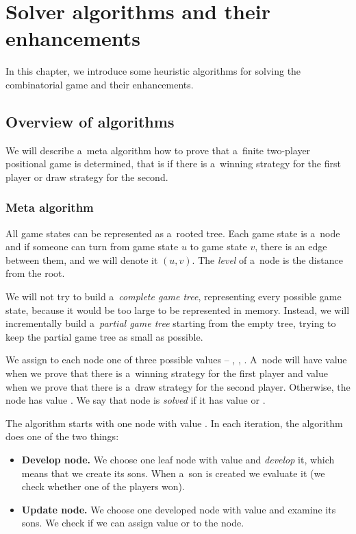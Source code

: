 \chapter{Solver algorithms and their enhancements}

In this chapter, we introduce some heuristic algorithms for solving the
combinatorial game and their enhancements.

\section{Overview of algorithms}

We will describe a~meta algorithm how to prove that a~finite two-player
positional game is determined, that is if there is a~winning strategy for the first
player or draw strategy for the second.

\subsection{Meta algorithm}

All game states can be represented as a~rooted tree. Each game state is a~node and if someone can turn from game state $u$ to game state $v$, there is an
edge between them, and we will denote it $(u,v)$. The \emph{level} of a~node
is the distance from the root. 

We will not try to build a~\emph{complete game tree}, representing every possible game
state, because it would be too large to be represented in memory. Instead, we
will incrementally build a~\emph{partial game tree} starting from the empty tree,
trying to keep the partial game tree as small as possible.

We assign to each node one of three possible values -- ,
, . A~node will have value  when we prove
that there is a~winning strategy for the first player and value 
when we prove that there is a~draw strategy for the second player. Otherwise,
the node has value . We say that node is \emph{solved} if it has value
 or .

The algorithm starts with one node with value . In each iteration, the
algorithm does one of the two things:

\begin{itemize} 
	\item \textbf{Develop node.} We choose one leaf node with value 
		and \emph{develop} it, which means that we create its sons. When 
		a~son is created we evaluate it (we check whether one of the players
		won).
	\item \textbf{Update node.} We choose one developed node with value 
		and examine its sons. We check if we can assign value  
		or  to the node.
\end{itemize}

